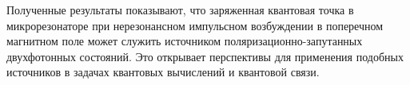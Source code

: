 \documentclass[11pt]{article}    %
\numberwithin{equation}{section}
\begin{document}
Полученные результаты показывают, что заряженная квантовая точка в
микрорезонаторе при нерезонансном импульсном возбуждении в поперечном
магнитном поле может служить источником поляризационно-запутанных
двухфотонных состояний. Это открывает перспективы для применения
подобных источников в задачах квантовых вычислений и квантовой связи.

%

\newpage
{}
\end{document}
